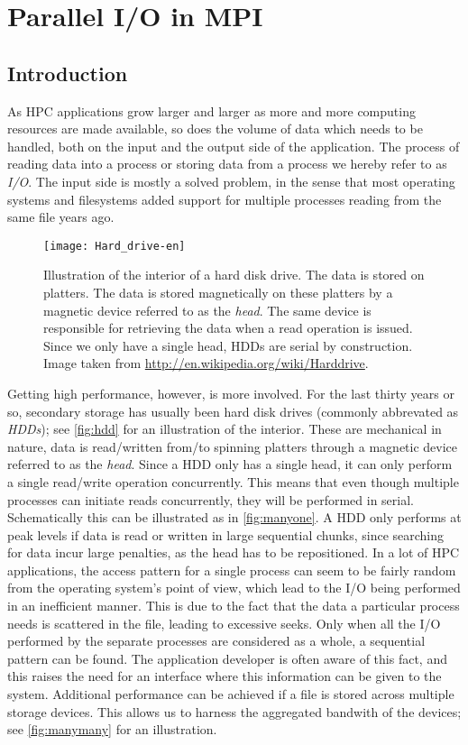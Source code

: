 \lstset{inputpath=code/mpiio/}

\chapter{Parallel I/O in MPI}

\section{Introduction}

As HPC applications grow larger and larger as more and more computing resources
are made available, so does the volume of data which needs to be handled, both
on the input and the output side of the application. The process of reading data
into a process or storing data from a process we hereby refer to as \emph{I/O}.
The input side is mostly a solved problem, in the sense that most operating
systems and filesystems added support for multiple processes reading from the
same file years ago.

\begin{figure}
  \centering
  \texttt{[image: Hard\_drive-en]}
  \caption{
    Illustration of the interior of a hard disk drive. The data is stored on
    platters. The data is stored magnetically on these platters by a magnetic
    device referred to as the \emph{head}. The same device is responsible for
    retrieving the data when a read operation is issued. Since we only have a
    single head, HDDs are serial by construction. Image taken from
    \url{http://en.wikipedia.org/wiki/Harddrive}.
  }
  \label{fig:hdd}
\end{figure}

Getting high performance, however, is more involved. For the last thirty years
or so, secondary storage has usually been hard disk drives (commonly abbrevated
as \emph{HDDs}); see \autoref{fig:hdd} for an illustration of the interior.
These are mechanical in nature, data is read/written from/to spinning platters
through a magnetic device referred to as the \emph{head}. Since a HDD only has a
single head, it can only perform a single read/write operation concurrently.
This means that even though multiple processes can initiate reads concurrently,
they will be performed in serial. Schematically this can be illustrated as in
\autoref{fig:manyone}. A HDD only performs at peak levels if data is read or
written in large sequential chunks, since searching for data incur large
penalties, as the head has to be repositioned. In a lot of HPC applications, the
access pattern for a single process can seem to be fairly random from the
operating system's point of view, which lead to the I/O being performed in an
inefficient manner. This is due to the fact that the data a particular process
needs is scattered in the file, leading to excessive seeks. Only when all the
I/O performed by the separate processes are considered as a whole, a sequential
pattern can be found. The application developer is often aware of this fact, and
this raises the need for an interface where this information can be given to the
system. Additional performance can be achieved if a file is stored across
multiple storage devices. This allows us to harness the aggregated bandwith of
the devices; see \autoref{fig:manymany} for an illustration.

